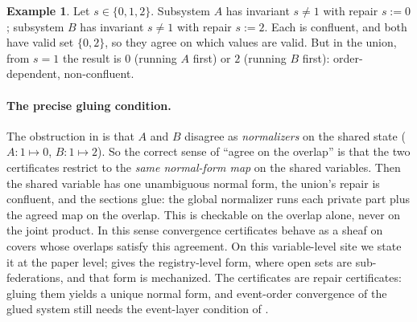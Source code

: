 \documentclass[11pt,a4paper]{article}
\theoremstyle{plain}
\theoremstyle{definition}
\newtheorem{example}[theorem]{Example}
\theoremstyle{remark}
\renewcommand{\_}{\origunderscore\allowbreak}
\begin{document}
\begin{example}
\label{ex:glue}
Let $s \in \{0,1,2\}$. Subsystem $A$ has invariant $s \neq 1$ with repair $s := 0$; subsystem $B$ has
invariant $s \neq 1$ with repair $s := 2$. Each is confluent, and both have valid set $\{0, 2\}$, so
they agree on which values are valid. But in the union, from $s = 1$ the result is $0$ (running $A$
first) or $2$ (running $B$ first): order-dependent, non-confluent.
\end{example}

\paragraph{The precise gluing condition.} The obstruction in  is that $A$ and $B$
disagree as \emph{normalizers} on the shared state ($A : 1 \mapsto 0$, $B : 1 \mapsto 2$). So the
correct sense of ``agree on the overlap'' is that the two certificates restrict to the \emph{same
normal-form map} on the shared variables. Then the shared variable has one unambiguous normal form,
the union's repair is confluent, and the sections glue: the global normalizer runs each private
part plus the agreed map on the overlap. This is checkable on the overlap alone, never on the joint
product. In this sense convergence certificates behave as a sheaf on covers whose overlaps satisfy
this agreement. On this variable-level site we state it at the paper level;  gives
the registry-level form, where open sets are sub-federations, and that form is mechanized. The certificates are repair certificates: gluing them yields a unique normal form, and
event-order convergence of the glued system still needs the event-layer condition of
.
\end{document}
